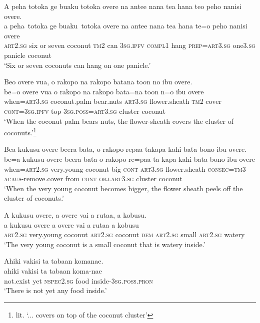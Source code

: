 \ea\label{ex:text01-32}
A peha totoka ge buaku totoka overe na antee nana tea hana teo peho nanisi overe.\\
\gll a	peha~totoka	ge	buaku~totoka	overe	na	antee	nana	tea	hana	te=o	peho	nanisi	overe\\
     \textsc{art}2.\textsc{sg}	six	or	seven	coconut	\textsc{tm}2	can	3\textsc{sg}.\textsc{ipfv}	\textsc{compl}1	hang	\textsc{prep}=\textsc{art}3.\textsc{sg}	one3.\textsc{sg}	panicle	coconut\\
\glt `Six or seven coconuts can hang on one panicle.'
\z

\ea\label{ex:text01-33}
Beo overe vua, o rakopo na rakopo batana toon no ibu overe.\\
\gll be=o	overe	vua	o	rakopo	na	rakopo	bata=na	toon	n=o	ibu	overe\\
     when=\textsc{art}3.\textsc{sg}	coconut.palm	bear.nuts	\textsc{art}3.\textsc{sg}	flower.sheath	\textsc{tm}2	cover	\textsc{cont}=3\textsc{sg}.\textsc{ipfv}	top	3\textsc{sg}.\textsc{poss}=\textsc{art}3.\textsc{sg}	cluster	coconut\\
\glt `When the coconut palm bears nuts, the flower-sheath covers the cluster of coconuts.'\footnote{lit. `... covers on top of the coconut cluster'}
\z

\ea\label{ex:text01-34}
Bea kukusu overe beera bata, o rakopo repaa takapa kahi bata bono ibu overe.\\
\gll be=a	kukusu	overe	beera	bata	o	rakopo	re=paa	ta-kapa	kahi	bata	bono	ibu	overe\\
     when=\textsc{art}2.\textsc{sg}	very.young	coconut	big	\textsc{cont}	\textsc{art}3.\textsc{sg}	flower.sheath	\textsc{consec}=\textsc{tm}3	\textsc{acaus}-remove.cover	from	\textsc{cont}	\textsc{obj}.\textsc{art}3.\textsc{sg}	cluster	coconut\\
\glt `When the very young coconut becomes bigger, the flower sheath peels off the cluster of coconuts.'
\z

\ea\label{ex:text01-35}
A kukusu overe, a overe vai a rutaa, a kobusu.\\
\gll a	kukusu	overe	a	overe	vai	a	rutaa	a	kobusu\\
     \textsc{art}2.\textsc{sg}	very.young	coconut	\textsc{art}2.\textsc{sg}	coconut	\textsc{dem}	\textsc{art}2.\textsc{sg}	small	\textsc{art}2.\textsc{sg}	watery\\
\glt `The very young coconut is a small coconut that is watery inside.'
\z

\ea\label{ex:text01-36}
Ahiki vakisi ta tabaan komanae.\\
\gll ahiki	vakisi	ta	tabaan	koma-nae\\
     not.exist	yet	\textsc{nspec}2.\textsc{sg}	food	inside-3\textsc{sg}.\textsc{poss}.\textsc{pron}\\
\glt `There is not yet any food inside.'
\z

